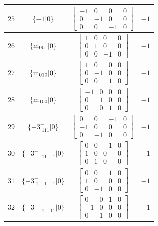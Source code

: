 \documentclass[fleqn,8pt]{jsarticle}
\begin{document}
\begin{longtable}{cccc}
$ 25 $ & $ \{-1|0\} $ & $ \begin{bmatrix} -1 & 0 & 0 & 0 \\ 0 & -1 & 0 & 0 \\ 0 & 0 & -1 & 0 \end{bmatrix} $ & $ -1 $ \\ \hline
$ 26 $ & $ \{{\rm m}_{001}|0\} $ & $ \begin{bmatrix} 1 & 0 & 0 & 0 \\ 0 & 1 & 0 & 0 \\ 0 & 0 & -1 & 0 \end{bmatrix} $ & $ -1 $ \\ \hline
$ 27 $ & $ \{{\rm m}_{010}|0\} $ & $ \begin{bmatrix} 1 & 0 & 0 & 0 \\ 0 & -1 & 0 & 0 \\ 0 & 0 & 1 & 0 \end{bmatrix} $ & $ -1 $ \\ \hline
$ 28 $ & $ \{{\rm m}_{100}|0\} $ & $ \begin{bmatrix} -1 & 0 & 0 & 0 \\ 0 & 1 & 0 & 0 \\ 0 & 0 & 1 & 0 \end{bmatrix} $ & $ -1 $ \\ \hline
$ 29 $ & $ \{-3^{+}_{\,\,111}|0\} $ & $ \begin{bmatrix} 0 & 0 & -1 & 0 \\ -1 & 0 & 0 & 0 \\ 0 & -1 & 0 & 0 \end{bmatrix} $ & $ -1 $ \\ \hline
$ 30 $ & $ \{-3^{+}_{\,\,-11-1}|0\} $ & $ \begin{bmatrix} 0 & 0 & -1 & 0 \\ 1 & 0 & 0 & 0 \\ 0 & 1 & 0 & 0 \end{bmatrix} $ & $ -1 $ \\ \hline
$ 31 $ & $ \{-3^{+}_{\,\,1-1-1}|0\} $ & $ \begin{bmatrix} 0 & 0 & 1 & 0 \\ 1 & 0 & 0 & 0 \\ 0 & -1 & 0 & 0 \end{bmatrix} $ & $ -1 $ \\ \hline
$ 32 $ & $ \{-3^{+}_{\,\,-1-11}|0\} $ & $ \begin{bmatrix} 0 & 0 & 1 & 0 \\ -1 & 0 & 0 & 0 \\ 0 & 1 & 0 & 0 \end{bmatrix} $ & $ -1 $ \\ \hline

\end{longtable}
\end{document}
